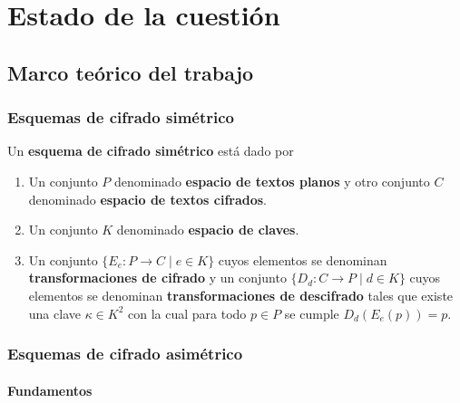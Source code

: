 \chapter{Estado de la cuestión}  

\section{Marco teórico del trabajo}

\subsection{Esquemas de cifrado simétrico}

\begin{definition}
	Un \textbf{esquema de cifrado simétrico} está dado por
	\begin{enumerate}
		\item Un conjunto $P$ denominado \textbf{espacio de textos planos} y otro conjunto $C$ denominado \textbf{espacio de textos cifrados}.
		\item Un conjunto $K$ denominado \textbf{espacio de claves}.
		\item Un conjunto $\{E_e : P \rightarrow C \mid e \in K\}$ cuyos elementos se denominan \textbf{transformaciones de cifrado} y un conjunto $\{D_d : C \rightarrow P \mid d \in K\}$ cuyos elementos se denominan \textbf{transformaciones de descifrado} tales que existe una clave $\kappa \in K^2$ con la cual para todo $p \in P$ se cumple $D_d(E_e(p)) = p$.
	\end{enumerate}
\end{definition}
\subsection{Esquemas de cifrado asimétrico}

\subsubsection{Fundamentos}

